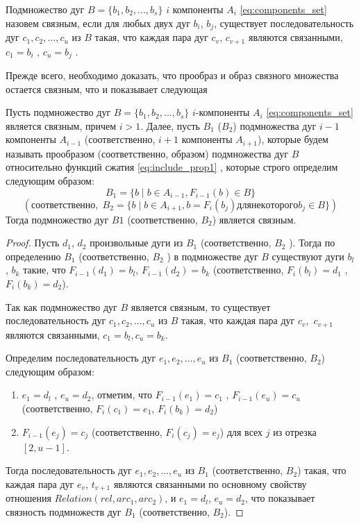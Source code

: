 \begin{definition}
Подмножество дуг $B = \{b_1, b_2, ..., b_s\}$  $i$  компоненты $A_i$ \ref{eq:components_set} назовем  связным, если для любых двух дуг $b_i$, $b_j$, существует последовательность дуг $c_1, c_2, ..., c_u$  из   $B$ такая, что  каждая пара дуг $c_v$, $c_{v+1}$ являются связанными,  $c_1 = b_i$ , $c_u = b_j$ .
\end{definition}

Прежде всего, необходимо доказать, что прообраз и образ связного множества остается связным, что и показывает следующая

\begin{lemma}
Пусть подмножество дуг $B = \{b_1, b_2, ..., b_s\}$  $i$-компоненты $A_i$ \ref{eq:components_set}  является связным, причем  $i > 1$.  Далее, пусть  $B_1$ ($B_2$) подмножества дуг $i-1$ компоненты $A_{i-1}$  (соответственно,  $i+1$ компоненты $A_{i+1}$), которые будем   называть прообразом  (соответственно,  образом)  подмножества  дуг $B$ относительно функций сжатия \ref{eq:include_prop1} , которые строго определим следующим образом: 
$$B_1 = \{b\; |\; b \in A_{i-1}, F_{i-1} (b) \in B \} $$
$$(\text{соответственно},\; B_2 = \{b\;|\;b \in A_{i+1} , b  = F_i (b_j)  для некоторого b_j \in B \})$$
Тогда подмножество дуг  $B1$ (соответственно,   $B_2$) является связным.
\end{lemma}
\begin{proof}
Пусть  $d_1$, $d_2$   произвольные дуги из $B_1$  (соответственно, $B_2$ ). Тогда по определению $B_1$  (соответственно,   $B_2$ ) в подмножестве дуг $B$ существуют  дуги  $b_l$, $b_k$  такие, что $F_{i-1}(d_1) = b_l$, $F_{i-1} (d_2) = b_k$ (соответственно,  $F_i (b_l) = d_1$ , $F_i (b_k) = d_2$).

Так как  подмножество дуг $B$ является связным, то  существует последовательность дуг  $c_1, c_2, ..., c_u$  из   $B$ такая, что  каждая пара дуг $c_v,$ $c_{v+1}$ являются связанными,  $c_1 = b_l , c_u = b_k$. 

Определим  последовательность дуг $e_1, e_2, ..., e_u$ из $B_1$ (соответственно, $B_2$) следующим образом:
\begin{enumerate}
\item $e_1 = d_l$ , $e_u = d_2$, отметим, что $F_{i-1} (e_1) = c_1$ , $F_{i-1} (e_u) = c_u$ (соответственно,  $F_i (c_1) = e_1$, $F_i(b_k) = d_2$)
\item $F_{i-1}(e_j) = c_j$  (соответственно,  $F_i (c_j) = e_j$)   для всех $j$  из отрезка  
$[2, u - 1]$.
\end{enumerate}
Тогда  последовательность дуг $e_1, e_2, ..., e_u$ из $B_1$ (соответственно, $B_2$) такая, что  каждая пара дуг $e_v$, $t_{v+1}$ являются связанными по основному свойству отношения $Relation(rel, arc_1, arc_2)$, и  $e_1 = d_l$, $e_u = d_2$, что показывает связность подмножеств дуг $B_1$ (соответственно, $B_2$).
\end{proof}

